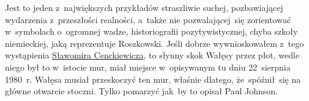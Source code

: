 \documentclass[a4paper,11pt]{article}
\begin{document}








\start {} Jest to jeden z~największych przykładów straszliwie
suchej, pozbawiającej wydarzenia z~przeszłości realności, a~także nie
pozwalającej~się zorientować w~symbolach o~ogromnej wadze,
historiografii pozytywistycznej, chyba szkoły niemieckiej, jaką
reprezentuje Roszkowski. Jeśli dobrze wywnioskowałem z~tego
wystąpienia
\href{https://www.youtube.com/watch?v=6B93_3CCMac}{Sławomira
  Cenckiewicza}, to słynny skok Wałęsy przez płot, wedle niego był to
w~istocie mur, miał miejsce w~opisywanym tu dniu 22~sierpnia 1980~r.
Wałęsa musiał przeskoczyć ten mur, właśnie dlatego, że~spóźnił~się na
główne otwarcie stoczni. Tylko pomarzyć jak~by to opisał Paul Johnson.
\end{document}
